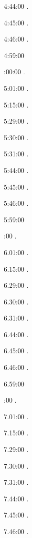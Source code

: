 4:44:00 .

4:45:00 .

4:46:00 .

4:59:00 

:00:00 .

5:01:00 . 

5:15:00 . 

5:29:00 . 

5:30:00 .

5:31:00 .

5:44:00 .

5:45:00 .

5:46:00 .

5:59:00 

:00 .

6.01:00 . 

6.15:00 . 

6.29:00 . 

6.30:00 .

6.31:00 .

6.44:00 .

6.45:00 .

6.46:00 .

6.59:00 

:00 .

7.01:00 . 

7.15:00 . 

7.29:00 . 

7.30:00 .

7.31:00 .

7.44:00 .

7.45:00 .

7.46:00 .

